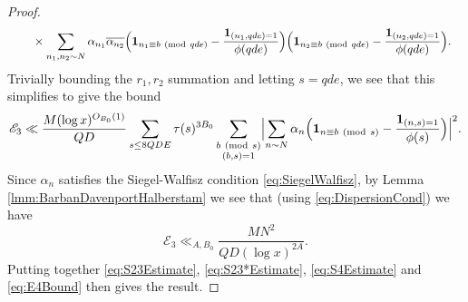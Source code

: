 \documentclass[10pt]{amsart}
\theoremstyle{plain}
\numberwithin{equation}{section}
\newcommand{\Mod}[1]{\ (\mathrm{mod}\ #1)}
\begin{document}
\begin{proof}
\begin{align*}
&\qquad\times\sum_{n_1,n_2\sim N}\alpha_{n_1}\overline{\alpha_{n_2}}\Bigl(\mathbf{1}_{n_1\equiv b\Mod{q d e}}-\frac{\mathbf{1}_{(n_1,q d e)=1}}{\phi(q d e)}\Bigr)\Bigl(\mathbf{1}_{n_2\equiv b\Mod{q d e}}-\frac{\mathbf{1}_{(n_2,q d e)=1}}{\phi(q d e)}\Bigr).
\end{align*}
Trivially bounding the $r_1,r_2$ summation and letting $s=q d e$, we see that this simplifies to give the bound
\[
\mathscr{E}_3\ll \frac{M(\log{x})^{O_{B_0}(1)}}{Q D}\sum_{\substack{s \le 8 Q D E }}\tau(s)^{3B_0}\sum_{\substack{b\Mod{s}\\ (b,s)=1}}\Bigl|\sum_{n\sim N}\alpha_{n}\Bigl(\mathbf{1}_{n\equiv b\Mod{s}}-\frac{\mathbf{1}_{(n,s)=1}}{\phi(s)}\Bigr)\Bigr|^2.
\]
Since $\alpha_n$ satisfies the Siegel-Walfisz condition \eqref{eq:SiegelWalfisz}, by Lemma \ref{lmm:BarbanDavenportHalberstam} we see that (using \eqref{eq:DispersionCond}) we have
\begin{equation}
\mathscr{E}_3\ll_{A,B_0} \frac{MN^2}{Q D(\log{x})^{2A}}.\label{eq:E4Bound}
\end{equation}
Putting together \eqref{eq:S23Estimate}, \eqref{eq:S23*Estimate}, \eqref{eq:S4Estimate} and \eqref{eq:E4Bound} then gives the result.
\end{proof}
%
%
%
%
%
%
%
%
\end{document}
